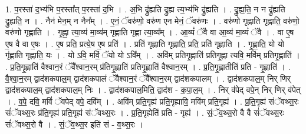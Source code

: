 \documentclass[17pt]{extarticle}
\begin{document}
1. प॒रस्ता॑ द॒भ्य॑भि प॒रस्ता᳚त् प॒रस्ता॑ द॒भि । . अ॒भि द्रु॑ह्यति द्रुह्य त्य॒भ्य॑भि द्रु॑ह्यति । . द्रु॒ह्य॒ति॒ न न द्रु॑ह्यति द्रुह्यति॒ न । . नैन॑ मेन॒म् न नैन᳚म् । . ए॒नं॒ ॅवरु॑णो॒ वरु॑ण एन मेनं॒ ॅवरु॑णः । . वरु॑णो गृह्णाति गृह्णाति॒ वरु॑णो॒ वरु॑णो गृह्णाति । . गृ॒ह्णा॒ त्या॒व्य॑ मा॒व्य॑म् गृह्णाति गृह्णा त्या॒व्य᳚म् । . आ॒व्यं॑ ॅवै वा आ॒व्य॑ मा॒व्यं॑ ॅवै । . वा ए॒ष ए॒ष वै वा ए॒षः । . ए॒ष प्रति॒ प्रत्ये॒ष ए॒ष प्रति॑ । . प्रति॑ गृह्णाति गृह्णाति॒ प्रति॒ प्रति॑ गृह्णाति । . गृ॒ह्णा॒ति॒ यो यो गृ॑ह्णाति गृह्णाति॒ यः । . यो ऽवि॒ मविं॒ ॅयो यो ऽवि᳚म् । . अवि॑म् प्रतिगृ॒ह्णाति॑ प्रतिगृ॒ह्णा त्यवि॒ मवि॑म् प्रतिगृ॒ह्णाति॑ । . प्र॒ति॒गृ॒ह्णाति॑ वैश्वान॒रं ॅवै᳚श्वान॒रम् प्र॑तिगृ॒ह्णाति॑ प्रतिगृ॒ह्णाति॑ वैश्वान॒रम् । . प्र॒ति॒गृ॒ह्णातीति॑ प्रति - गृ॒ह्णाति॑ । . वै॒श्वा॒न॒रम् द्वाद॑शकपाल॒म् द्वाद॑शकपालं ॅवैश्वान॒रं ॅवै᳚श्वान॒रम् द्वाद॑शकपालम् । . द्वाद॑शकपाल॒म् निर् णिर् द्वाद॑शकपाल॒म् द्वाद॑शकपाल॒म् निः । . द्वाद॑शकपाल॒मिति॒ द्वाद॑श - क॒पा॒ल॒म् । . निर् व॑पेद् वपे॒न् निर् णिर् व॑पेत् । . व॒पे॒ दवि॒ मविं॑ ॅवपेद् वपे॒ दवि᳚म् । . अवि॑म् प्रति॒गृह्य॑ प्रति॒गृह्यावि॒ मवि॑म् प्रति॒गृह्य॑ । . प्र॒ति॒गृह्य॑ संॅवथ्स॒रः सं॑ॅवथ्स॒रः प्र॑ति॒गृह्य॑ प्रति॒गृह्य॑ संॅवथ्स॒रः । . प्र॒ति॒गृह्येति॑ प्रति - गृह्य॑ । . सं॒ॅव॒थ्स॒रो वै वै सं॑ॅवथ्स॒रः सं॑ॅवथ्स॒रो वै । . सं॒ॅव॒थ्स॒र इति॑ सं - व॒थ्स॒रः । \newline
\end{document}
